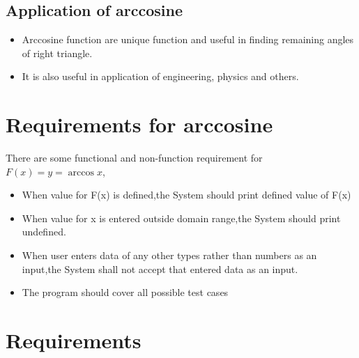 \documentclass[a4paper,10pt]{report}
\begin{document}
\subsection{Application of arccosine}
\begin{itemize}[noitemsep]
\item Arccosine function are unique function and useful in finding remaining angles of right triangle.
\item It is also useful in application of engineering, physics and others.
\end{itemize}

\section{Requirements for arccosine}
There are some functional and non-function requirement for $F(x)=y=\arccos x$,
\begin{itemize}[noitemsep]
\item When value for F(x) is defined,the System should print  defined value of F(x)
\item When value for x is entered outside domain range,the System should print undefined.
\item When user enters data of any other types rather than numbers as an input,the System shall not accept that entered data as an input.
\item The program should cover all possible test cases
\end{itemize}


\section{Requirements}
\end{document}

